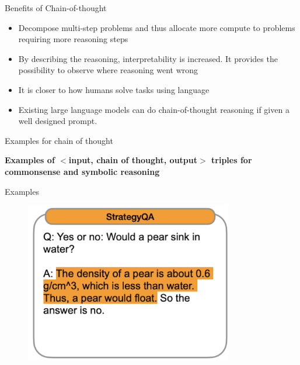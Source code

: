 

\begin{vbframe}{Benefits of Chain-of-thought}

\vfill

\begin{itemize}
    \item Decompose multi-step problems and thus allocate more compute to problems requiring more reasoning steps
    \item By describing the reasoning, interpretability is increased. It provides the possibility to observe where reasoning went wrong
    \item It is closer to how humans solve tasks using language
    \item Existing large language models can do
    chain-of-thought reasoning if given a well designed prompt.
\end{itemize}

\vfill

\end{vbframe}



\begin{vbframe}{Examples for chain of thought}

\vfill

\textbf{Examples of $<$input, chain of thought, output$>$ triples for  commonsense and symbolic reasoning}



\vfill

\end{vbframe}


\begin{vbframe}{Examples}

\vfill

\begin{figure}
    \centering
    \includegraphics[height=7cm]{figure/cotex1.png}
\end{figure}

\vfill

\end{vbframe}

